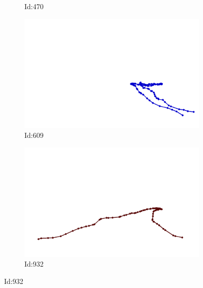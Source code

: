 \documentclass[12pt,twoside]{report}
\begin{document}
\begin{figure}
\begin{subfigure}[b]{0.20\textwidth}
\caption{Id:470}
\end{subfigure}
\begin{subfigure}[b]{0.20\textwidth}
\centering
\includegraphics[width=\textwidth]{../../trajectories/609.png}
\caption{Id:609}
\end{subfigure}
\begin{subfigure}[b]{0.20\textwidth}
\centering
\includegraphics[width=\textwidth]{../../trajectories/932.png}
\caption{Id:932}
\end{subfigure}
\end{figure}
\end{document}
